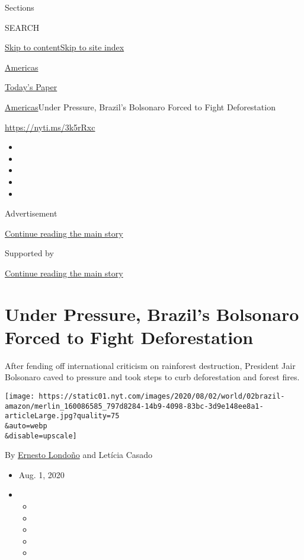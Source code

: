 Sections

SEARCH

\protect\hyperlink{site-content}{Skip to
content}\protect\hyperlink{site-index}{Skip to site index}

\href{https://www.nytimes.com/section/world/americas}{Americas}

\href{https://myaccount.nytimes.com/auth/login?response_type=cookie\&client_id=vi}{}

\href{https://www.nytimes.com/section/todayspaper}{Today's Paper}

\href{/section/world/americas}{Americas}\textbar{}Under Pressure,
Brazil's Bolsonaro Forced to Fight Deforestation

\url{https://nyti.ms/3k5rRxc}

\begin{itemize}
\item
\item
\item
\item
\item
\end{itemize}

Advertisement

\protect\hyperlink{after-top}{Continue reading the main story}

Supported by

\protect\hyperlink{after-sponsor}{Continue reading the main story}

\hypertarget{under-pressure-brazils-bolsonaro-forced-to-fight-deforestation}{%
\section{Under Pressure, Brazil's Bolsonaro Forced to Fight
Deforestation}\label{under-pressure-brazils-bolsonaro-forced-to-fight-deforestation}}

After fending off international criticism on rainforest destruction,
President Jair Bolsonaro caved to pressure and took steps to curb
deforestation and forest fires.

\texttt{[image: https://static01.nyt.com/images/2020/08/02/world/02brazil-amazon/merlin\_160086585\_797d8284-14b9-4098-83bc-3d9e148ee8a1-articleLarge.jpg?quality=75\\\&auto=webp\\\&disable=upscale]}

By \href{https://www.nytimes.com/by/ernesto-londono}{Ernesto Londoño}
and Letícia Casado

\begin{itemize}
\item
  Aug. 1, 2020
\item
  \begin{itemize}
  \item
  \item
  \item
  \item
  \item
  \end{itemize}
\end{itemize}

